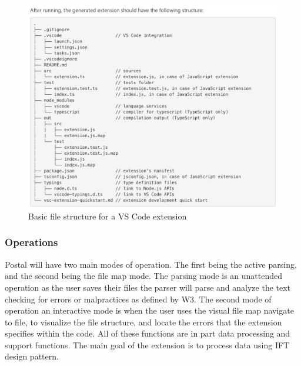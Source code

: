 \documentclass[letterpaper,10pt,titlepage,draftclsnofoot,onecolumn,onesided] {IEEEtran}
\begin{document}
\begin{figure}
\centering
\includegraphics[scale=0.5]{fileStructure.png}
\caption{Basic file structure for a VS Code extension}
\end{figure}

\subsubsection{Operations}
Postal will have two main modes of operation.
The first being the active parsing, and the second being the file map mode.
The parsing mode is an unattended operation as the user saves their files the parser will parse and analyze the text checking for errors or malpractices as defined by W3.
The second mode of operation an interactive mode is when the user uses the visual file map navigate to file, to visualize the file structure, and locate the errors that the extension specifies within the code. 
All of these functions are in part data processing and support functions. 
The main goal of the extension is to process data using IFT design pattern.
\end{document}
